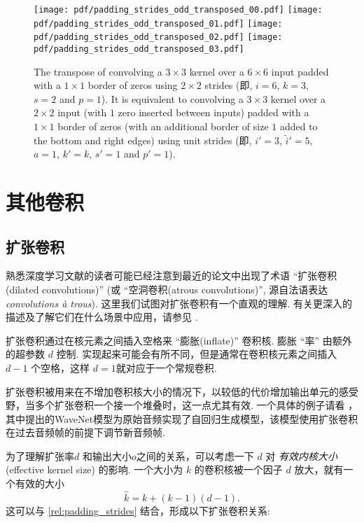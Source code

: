\documentclass[notitlepage]{ctexrep}
\begin{document}
\begin{figure}[p]
    \centering
    \texttt{[image: pdf/padding\_strides\_odd\_transposed\_00.pdf]}
    \texttt{[image: pdf/padding\_strides\_odd\_transposed\_01.pdf]}
    \texttt{[image: pdf/padding\_strides\_odd\_transposed\_02.pdf]}
    \texttt{[image: pdf/padding\_strides\_odd\_transposed\_03.pdf]}
    \caption{\label{fig:padding_strides_odd_transposed} The transpose of
        convolving a $3 \times 3$ kernel over a $6 \times 6$ input padded with a
        $1 \times 1$ border of zeros using $2 \times 2$ strides (即, $i = 6$,
        $k = 3$, $s = 2$ and $p = 1$). It is equivalent to convolving a $3
        \times 3$ kernel over a $2 \times 2$ input (with $1$ zero inserted
        between inputs) padded with a $1 \times 1$ border of zeros (with an
        additional border of size $1$ added to the bottom and right edges) using
        unit strides (即, $i' = 3$, $\tilde{i}' = 5$, $a = 1$, $k' = k$, $s' =
        1$ and $p' = 1$).}
\end{figure}

\chapter{其他卷积}

\section{扩张卷积}

熟悉深度学习文献的读者可能已经注意到最近的论文中出现了术语
``扩张卷积(dilated convolutions)'' (或 ``空洞卷积(atrous convolutions)'', 源自法语表达{\em convolutions \`{a} trous}). 这里我们试图对扩张卷积有一个直观的理解. 有关更深入的描述及了解它们在什么场景中应用，请参见 \citet{chen2014semantic,yu2015multi}.

扩张卷积通过在核元素之间插入空格来 ``膨胀(inflate)'' 卷积核. 膨胀 ``率'' 由额外的超参数 $d$ 控制. 实现起来可能会有所不同，但是通常在卷积核元素之间插入 $d - 1$
个空格，这样 $d = 1$就对应于一个常规卷积.

扩张卷积被用来在不增加卷积核大小的情况下，以较低的代价增加输出单元的感受野，当多个扩张卷积一个接一个堆叠时，这一点尤其有效. 一个具体的例子请看 \citet{oord2016wavenet}，其中提出的WaveNet模型为原始音频实现了自回归生成模型，该模型使用扩张卷积在过去音频帧的前提下调节新音频帧.

为了理解扩张率$d$ 和输出大小$o$之间的关系，可以考虑一下 $d$ 对 {\em 有效内核大小}(effective kernel
size) 的影响. 一个大小为 $k$ 的卷积核被一个因子 $d$ 放大，就有一个有效的大小
\begin{equation*}
    \hat{k} = k + (k - 1)(d - 1).
\end{equation*}
这可以与 \autoref{rel:padding_strides} 结合，形成以下扩张卷积关系:
\end{document}
